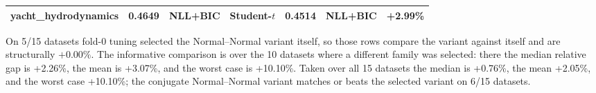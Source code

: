 \begin{table}[htbp]
\begin{tabular}{lrlllrl}
yacht\_hydrodynamics & 0.4649 & NLL+BIC & Student-$t$ & 0.4514 & NLL+BIC & +2.99\% \\
\bottomrule
\end{tabular}
\par\smallskip\footnotesize{On 5/15 datasets fold-0 tuning selected the Normal--Normal variant itself, so those rows compare the variant against itself and are structurally $+0.00\%$. The informative comparison is over the 10 datasets where a different family was selected: there the median relative gap is +2.26\%, the mean is +3.07\%, and the worst case is +10.10\%. Taken over all 15 datasets the median is +0.76\%, the mean +2.05\%, and the worst case +10.10\%; the conjugate Normal--Normal variant matches or beats the selected variant on 6/15 datasets.}
\end{table}
